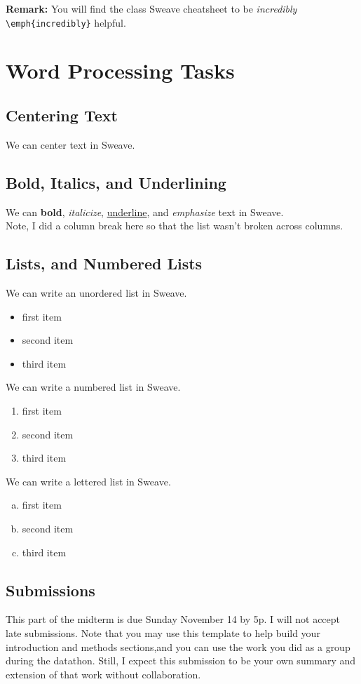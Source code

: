 \documentclass{article}\usepackage[]{graphicx}\usepackage[]{xcolor}
\begin{document}
\begin{multicols}{2}
\noindent \textbf{Remark:} You will find the class Sweave cheatsheet to be \emph{incredibly} \verb|\emph{incredibly}| helpful. 

\section{Word Processing Tasks}
\subsection{Centering Text}
 \begin{center}
 We can center text in Sweave.
 \end{center}

\subsection{Bold, Italics, and Underlining}
 We can \textbf{bold}, \textit{italicize}, \underline{underline}, and \emph{emphasize} text in
 Sweave. \\
\indent Note, I did a column break here so that the list wasn’t broken across columns.
\columnbreak

\subsection{Lists, and Numbered Lists}
We can write an unordered list in Sweave.
 \begin{itemize}\itemsep0em
 \item first item
 \item second item
 \item third item
 \end{itemize}
We can write a numbered list in Sweave.
 \begin{enumerate}[1.]\itemsep0em
 \item first item
 \item second item
 \item third item
 \end{enumerate}
We can write a lettered list in Sweave.
 \begin{enumerate}[a.]\itemsep0em
 \item first item
 \item second item
 \item third item
 \end{enumerate}

\subsection{Submissions}
This part of the midterm is due Sunday November 14 by 5p. I will not accept late submissions. Note that you may use
this template to help build your introduction and methods
 sections,and you can use the work you did as a group during the datathon. Still, I expect this submission to be your own summary and extension of that work without collaboration.


\end{multicols}
\end{document}
